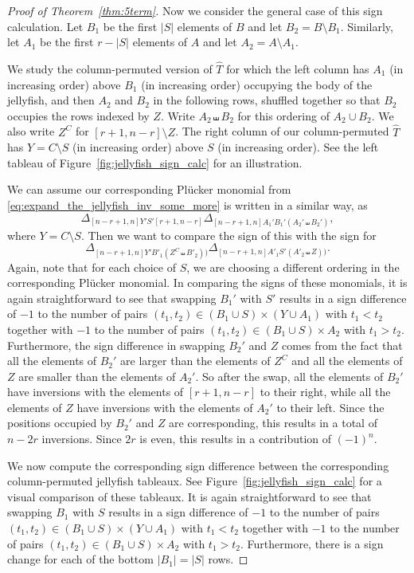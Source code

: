 \documentclass[ALCO, Unicode]{cedram}
\numberwithin{equation}{section}
\begin{document}
\begin{proof}[Proof of Theorem~\ref{thm:5term}]
Now we consider the general case of this sign calculation. 
Let $B_1$ be the first $|S|$ elements of $B$ and let $B_2 = B \setminus B_1$. Similarly, let $A_1$ be the first $r - |S|$ elements of $A$ and let $A_2 = A \setminus A_1$.

We study the column-permuted version of $\widehat{T}$ for which the left column has $A_1$ (in increasing order) above $B_1$ (in increasing order) occupying the body of the jellyfish, and then $A_2$ and $B_2$ in the following rows, shuffled together so that $B_2$ occupies the rows indexed by $Z$. Write $A_2 \shuffle B_2$ for this ordering of $A_2 \cup B_2$. We also write $Z^C$ for $[r+1,n-r] \setminus Z$. The right column of our column-permuted $\widehat{T}$ has $Y = C \setminus S$ (in increasing order) above $S$ (in increasing order). See the left tableau of Figure~\ref{fig:jellyfish_sign_calc} for an illustration.

We can assume our corresponding Pl\"ucker monomial from \eqref{eq:expand_the_jellyfish_inv_some_more} is written in a similar way, as \[
\Delta_{[n-r+1,n]  Y'S' [r+1,n-r]} \Delta_{[n-r+1,n]  A_1'B_1' (A_2' \shuffle B_2')},
\]
where $Y = C \setminus S$. Then we want to compare the sign of this with the sign for
\[
\Delta_{[n-r+1,n]Y'B'_1(Z^C \shuffle B'_2))} \Delta_{[n-r+1,n]A'_1S'(A'_2 \shuffle Z))}.
\]
Again, note that for each choice of $S$, we are choosing a different ordering in the corresponding Pl\"ucker monomial. 
In comparing the signs of these monomials, it is again straightforward to see that swapping $B_1'$ with $S'$ results in a sign difference of $-1$ to the number of pairs $(t_1, t_2) \in (B_1 \cup S) \times (Y \cup A_1)$ with $t_1 < t_2$ together with $-1$ to the number of pairs $(t_1, t_2) \in (B_1 \cup S) \times A_2$ with $t_1 > t_2$. 
Furthermore, the sign difference in swapping $B_2'$ and $Z$ comes from the fact that all the elements of $B_2'$ are larger than the elements of $Z^C$ and all the elements of $Z$ are smaller than the elements of $A_2'$. So after the swap, all the elements of $B_2'$ have inversions with  the elements of $[r+1,n-r]$ to their right, while all the elements of $Z$ have inversions with the elements of $A_2'$ to their left. Since the positions occupied by $B_2'$ and $Z$ are corresponding, this results in a total of $n-2r$ inversions. Since $2r$ is even, this results in a contribution of $(-1)^n$.

We now compute the corresponding sign difference between the corresponding column-permuted jellyfish tableaux. See Figure~\ref{fig:jellyfish_sign_calc} for a visual comparison of these tableaux. It is again straightforward to see that swapping $B_1$ with $S$ results in a sign difference of $-1$ to the number of pairs $(t_1, t_2) \in (B_1 \cup S) \times (Y \cup A_1)$ with $t_1 < t_2$ together with $-1$ to the number of pairs $(t_1, t_2) \in (B_1 \cup S) \times A_2$ with $t_1 > t_2$. Furthermore, there is a sign change for each of the bottom $|B_1| = |S|$ rows.


\end{proof}
\end{document}
